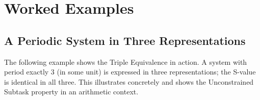 \section{Worked Examples}
\label{sec:ch01-worked-examples}

\subsection{A Periodic System in Three Representations}
\label{subsec:periodic-example}

The following example shows the Triple Equivalence in action.  A system
with period exactly $3$ (in some unit) is expressed in three representations;
the S-value is identical in all three.  This illustrates
 concretely and shows the Unconstrained Subtask
property in an arithmetic context.


